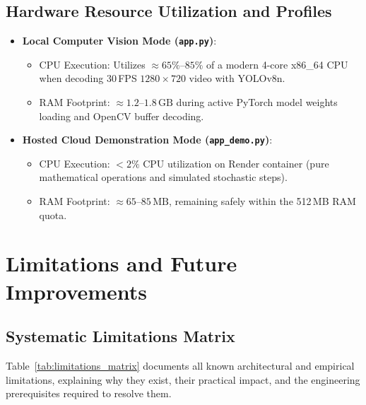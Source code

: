 \documentclass[11pt,a4paper,oneside]{report}
\begin{document}
\section{Hardware Resource Utilization and Profiles}
\begin{itemize}[leftmargin=*]
    \item \textbf{Local Computer Vision Mode (\texttt{app.py})}:
    \begin{itemize}
        \item CPU Execution: Utilizes $\approx 65\%\text{--}85\%$ of a modern 4-core x86\_64 CPU when decoding 30\,FPS $1280 \times 720$ video with YOLOv8n.
        \item RAM Footprint: $\approx 1.2\text{--}1.8\,\text{GB}$ during active PyTorch model weights loading and OpenCV buffer decoding.
    \end{itemize}
    \item \textbf{Hosted Cloud Demonstration Mode (\texttt{app\_demo.py})}:
    \begin{itemize}
        \item CPU Execution: $< 2\%$ CPU utilization on Render container (pure mathematical operations and simulated stochastic steps).
        \item RAM Footprint: $\approx 65\text{--}85\,\text{MB}$, remaining safely within the 512\,MB RAM quota.
    \end{itemize}
\end{itemize}



\chapter{Limitations and Future Improvements}

\section{Systematic Limitations Matrix}
Table~\ref{tab:limitations_matrix} documents all known architectural and empirical limitations, explaining why they exist, their practical impact, and the engineering prerequisites required to resolve them.
\end{document}
